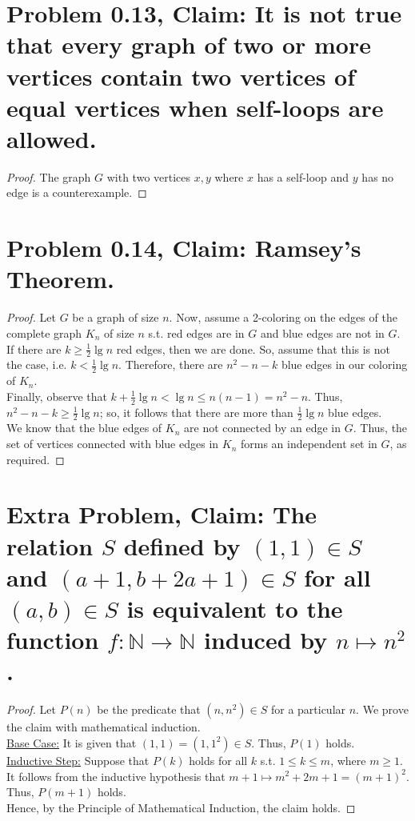 \documentclass[12pt]{article}
\begin{document}
\section*{Problem 0.13, Claim: It is not true that every graph of two or more vertices contain two vertices of equal vertices when self-loops are allowed.}
\begin{proof}
The graph $G$ with two vertices $x, y$ where $x$ has a self-loop and $y$ has no edge is a counterexample.
\end{proof}

\section*{Problem 0.14, Claim: Ramsey's Theorem.}
\begin{proof}
	Let $G$ be a graph of size $n$. Now, assume a 2-coloring on the edges of the complete graph $K_{n}$ of size $n$ s.t. red edges are in $G$ and blue edges are not in $G$. \\
	\newline
	If there are $k \geq \frac{1}{2}\lg{n}$ red edges, then we are done. So, assume that this is not the case, i.e. $k < \frac{1}{2}\lg{n}$. Therefore, there are $n^{2} - n - k$ blue edges in our coloring of $K_{n}$. \\
	\newline
	Finally, observe that $k + \frac{1}{2}\lg{n} < \lg{n} \leq n(n - 1) = n^{2} - n$. Thus, $n^{2} - n - k \ge \frac{1}{2}\lg{n}$; so, it follows that there are more than $\frac{1}{2}\lg{n}$ blue edges. \\
	\newline
	We know that the blue edges of $K_{n}$ are not connected by an edge in $G$. Thus, the set of vertices connected with blue edges in $K_{n}$ forms an independent set in $G$, as required.
\end{proof}

\section*{Extra Problem, Claim: The relation $S$ defined by $(1, 1) \in S$ and $(a + 1, b + 2a + 1) \in S$ for all $(a, b) \in S$ is equivalent to the function $f: \mathbb{N} \rightarrow \mathbb{N}$ induced by $n \mapsto n^{2}$.}
\begin{proof}
	Let $P(n)$ be the predicate that $(n, n^{2}) \in S$ for a particular $n$. We prove the claim with mathematical induction. \\
	\newline
	\underline{Base Case:} It is given that $(1, 1) = (1, 1^{2}) \in S$. Thus, $P(1)$ holds. \\
	\newline
	\underline{Inductive Step:} Suppose that $P(k)$ holds for all $k$ s.t. $1 \leq k \leq m$, where $m \geq 1$. It follows from the inductive hypothesis that $m + 1 \mapsto m^{2} + 2m + 1 = (m + 1)^{2}$. Thus, $P(m + 1)$ holds. \\
	\newline
	Hence, by the Principle of Mathematical Induction, the claim holds.
\end{proof}
\end{document}
